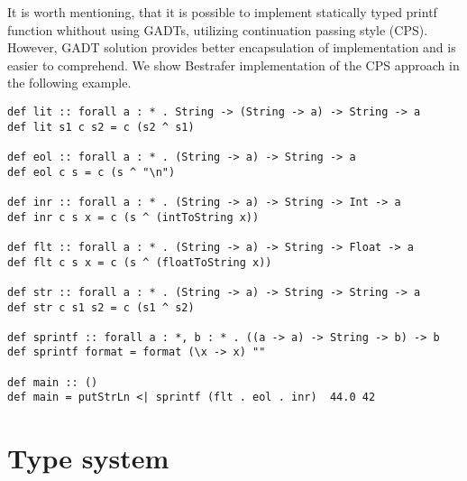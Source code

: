 \documentclass[declaration,shortabstract,english]{iithesis}
\begin{document}
It is worth mentioning, that it is possible to implement statically typed printf function
whithout using GADTs, utilizing continuation passing style (CPS)\cite{unparsing}.
However, GADT solution provides better encapsulation of implementation and
is easier to comprehend. We show Bestrafer implementation of the CPS approach in the following example.
\begin{verbatim}
def lit :: forall a : * . String -> (String -> a) -> String -> a
def lit s1 c s2 = c (s2 ^ s1)

def eol :: forall a : * . (String -> a) -> String -> a
def eol c s = c (s ^ "\n")

def inr :: forall a : * . (String -> a) -> String -> Int -> a
def inr c s x = c (s ^ (intToString x))

def flt :: forall a : * . (String -> a) -> String -> Float -> a
def flt c s x = c (s ^ (floatToString x))

def str :: forall a : * . (String -> a) -> String -> String -> a
def str c s1 s2 = c (s1 ^ s2)

def sprintf :: forall a : *, b : * . ((a -> a) -> String -> b) -> b
def sprintf format = format (\x -> x) ""

def main :: ()
def main = putStrLn <| sprintf (flt . eol . inr)  44.0 42
\end{verbatim}

\chapter{Type system}
\end{document}
